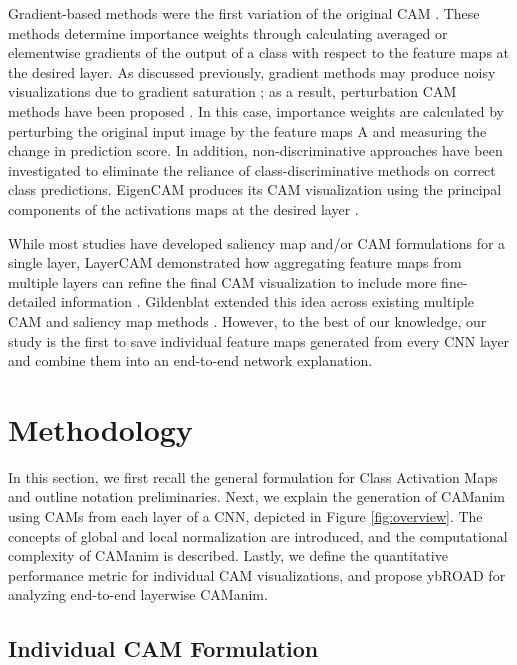 \documentclass[10pt, conference, compsocconf]{IEEEtran}
\begin{document}
Gradient-based methods were the first variation of the original CAM \cite{gradcam, gradcampp, Fu20, Gildenblat21, Draelos20, Jiang21} . These methods determine importance weights through calculating averaged or elementwise gradients of the output of a class with respect to the feature maps at the desired layer. As discussed previously, gradient methods may produce noisy visualizations due to gradient saturation \cite{adebayo2018sanity, kindermans2019reliability, Wang20, Desai20, eigencam}; as a result, perturbation CAM methods have been proposed \cite{Wang20, Desai20} . In this case, importance weights are calculated by perturbing the original input image by the feature maps A and measuring the change in prediction score. In addition, non-discriminative approaches have been investigated to eliminate the reliance of class-discriminative methods on correct class predictions. EigenCAM produces its CAM visualization using the principal components of the activations maps at the desired layer \cite{eigencam}.

While most studies have developed saliency map and/or CAM formulations for a single layer, LayerCAM demonstrated how aggregating feature maps from multiple layers can refine the final CAM visualization to include more fine-detailed information \cite{Jiang21}. Gildenblat extended this idea across existing multiple CAM and saliency map methods \cite{Gildenblat21}. However, to the best of our knowledge, our study is the first to save individual feature maps generated from every CNN layer and combine them into an end-to-end network explanation.

\section{Methodology}

In this section, we first recall the general formulation for Class Activation Maps and outline notation preliminaries. Next, we explain the generation of CAManim using CAMs from each layer of a CNN, depicted in Figure \ref{fig:overview}. The concepts of global and local normalization are introduced, and the computational complexity of CAManim is described. Lastly, we define the quantitative performance metric for individual CAM visualizations, and propose ybROAD for analyzing end-to-end layerwise CAManim. 

\subsection{Individual CAM Formulation}
\end{document}
